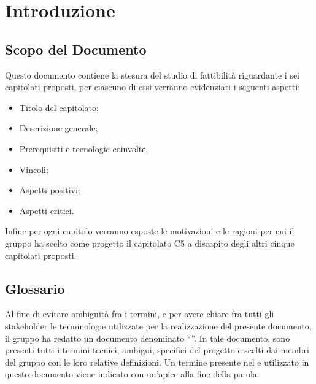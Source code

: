\section{Introduzione}
\subsection{Scopo del Documento}
Questo documento contiene la stesura del studio di fattibilità riguardante i sei capitolati proposti, per ciascuno di essi verranno evidenziati i seguenti aspetti:
\begin{itemize}
\item Titolo del capitolato;
\item Descrizione generale;
\item Prerequisiti e tecnologie coinvolte;
\item Vincoli;
\item Aspetti positivi;
\item Aspetti critici.
\end{itemize}
Infine per ogni capitolo verranno esposte le motivazioni e le ragioni per cui il gruppo ha scelto come progetto il capitolato C5 \NomeProgetto{} a discapito degli altri cinque capitolati proposti.

\subsection{Glossario}
Al fine di evitare ambiguità fra i termini, e per avere chiare fra tutti gli stakeholder le terminologie utilizzate per la realizzazione del presente documento, il gruppo \Gruppo{} ha redatto un documento denominato “”.
In tale documento, sono presenti tutti i termini tecnici, ambigui, specifici del progetto e scelti dai membri del gruppo con le loro relative definizioni.
Un termine presente nel  e utilizzato in questo documento viene indicato con un'apice  alla fine della parola.
	